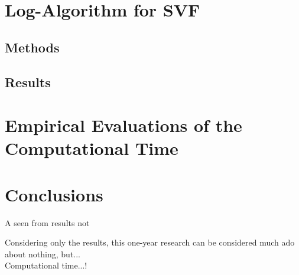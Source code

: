 \section{Log-Algorithm for SVF}


\subsection{Methods}

\subsection{Results}


\section{Empirical Evaluations of the Computational Time}




\newpage
\section{Conclusions}\label{se:conclusions}



A seen from results not 


Considering only the results, this one-year research can be considered much ado about nothing, but...\\
Computational time...!

